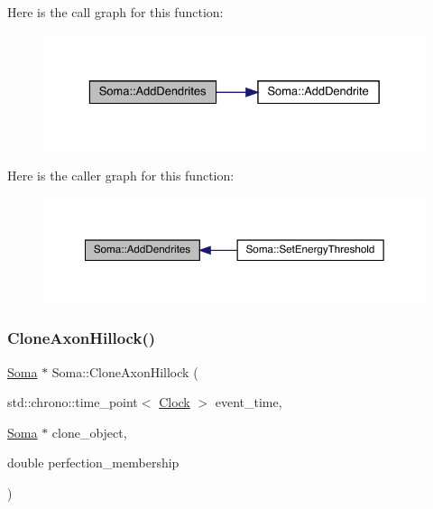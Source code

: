 Here is the call graph for this function\+:
\nopagebreak
\begin{figure}[H]
\begin{center}
\leavevmode
\includegraphics[width=329pt]{class_soma_a9874f03b33413b06ca74a3143cc35331_cgraph}
\end{center}
\end{figure}
Here is the caller graph for this function\+:
\nopagebreak
\begin{figure}[H]
\begin{center}
\leavevmode
\includegraphics[width=350pt]{class_soma_a9874f03b33413b06ca74a3143cc35331_icgraph}
\end{center}
\end{figure}
\mbox{\label{class_soma_a31463fba2f535e9c7cb05c8622fe3562}} 
\subsubsection{\texorpdfstring{Clone\+Axon\+Hillock()}{CloneAxonHillock()}}
{\footnotesize\ttfamily \hyperlink{class_soma}{Soma} $\ast$ Soma\+::\+Clone\+Axon\+Hillock (\begin{DoxyParamCaption}\item[{std\+::chrono\+::time\+\_\+point$<$ \hyperlink{universe_8h_a0ef8d951d1ca5ab3cfaf7ab4c7a6fd80}{Clock} $>$}]{event\+\_\+time,  }\item[{\hyperlink{class_soma}{Soma} $\ast$}]{clone\+\_\+object,  }\item[{double}]{perfection\+\_\+membership }\end{DoxyParamCaption})}



